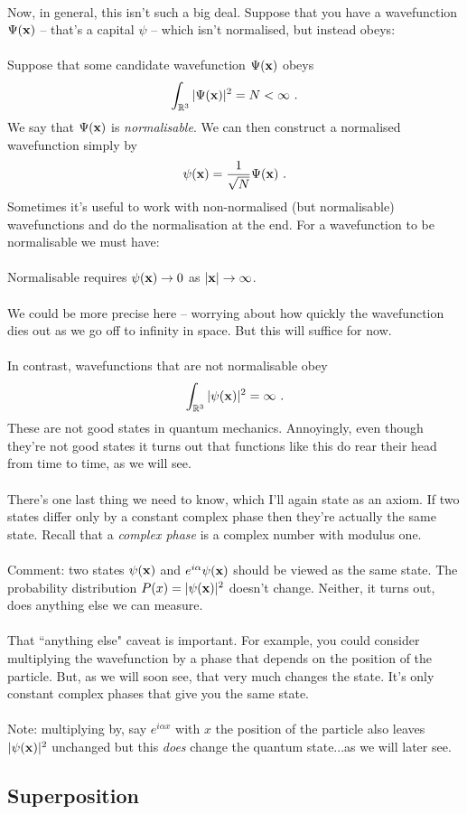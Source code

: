 \documentclass[12pt]{article}
\def\be{\begin{eqnarray}}
\def\ee{\end{eqnarray}}
\newcommand{\nn}{\nonumber}
\newcommand\para{\paragraph{}}
\newcommand{\ra}{\rightarrow}
\newcommand{\bx}{{\bf x}}
\begin{document}
\para
Now, in general, this isn't such a big deal. Suppose that you have a wavefunction $\Psi(\bx)$ -- that's a capital $\psi$ -- which isn't normalised, but instead obeys:

\para
{\color{olive} Suppose that some candidate wavefunction $\Psi(\bx)$ obeys
%
\be \int_{\mathbb{R}^3} |\Psi(\bx)|^2 = N< \infty\ .\nn\ee
%
We say that $\Psi(\bx)$ is {\it normalisable}. We can then construct a normalised wavefunction simply by 
%
\be \psi(\bx) = \frac{1}{\sqrt{N}} \Psi(\bx)\ .\nn\ee} 
%
Sometimes it's useful to work with non-normalised (but normalisable) wavefunctions and do the normalisation at the end. For a wavefunction to be normalisable we must have:

\para
%
{\color{olive} Normalisable requires $\psi(\bx) \ra 0$ as $|\bx| \ra \infty$.}
\para
We could be more precise here -- worrying about how quickly the wavefunction dies out as we go off to infinity in space. But this will suffice for now. 

\para
{\color{olive} In contrast, wavefunctions that are not normalisable obey
%
\be \int_{\mathbb{R}^3} |\psi(\bx)|^2 = \infty\ .\nn\ee
%
These are not good states in quantum mechanics.}  Annoyingly, even though they're not good states it turns out that functions like this do rear their head from time to time, as we will see. 

\para
There's one last thing we need to know, which I'll again state as an axiom. If two states differ only by a constant complex phase then they're actually the same state. Recall that a {\it complex phase} is a complex number with modulus one. 

\para
{\color{olive} Comment: two states $\psi(\bx)$ and $e^{i\alpha} \psi(\bx)$ should be viewed as the same state. The probability distribution $P(x) = |\psi(\bx)|^2$ doesn't change. Neither, it turns out, does anything else we can measure. }

\para
That ``anything else" caveat is important. For example, you could consider multiplying the wavefunction by a phase that depends on the position of the particle. But, as we will soon see, that very much changes the state. It's only constant complex phases that give you the same state. 

\para
{\color{olive} Note: multiplying by, say $e^{i\alpha x}$ with $x$ the position of the particle also leaves $|\psi(\bx)|^2$ unchanged but this {\it does} change the quantum state...as we will later see.}


\subsection{Superposition}
\end{document}

